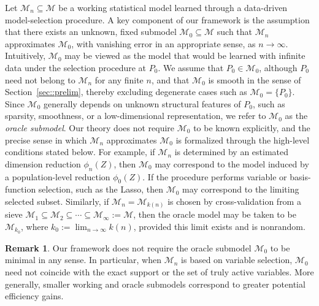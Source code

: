 \documentclass[11pt]{article}
\theoremstyle{definition}
\newtheorem{remark}{Remark}
\begin{document}
Let \(\mathcal{M}_n \subseteq \mathcal{M}\) be a working statistical model learned through a data-driven model-selection procedure. A key component of our framework is the assumption that there exists an unknown, fixed submodel \(\mathcal{M}_0 \subseteq \mathcal{M}\) such that \(\mathcal{M}_n\) approximates \(\mathcal{M}_0\), with vanishing error in an appropriate sense, as \(n \to \infty\). Intuitively, \(\mathcal{M}_0\) may be viewed as the model that would be learned with infinite data under the selection procedure at \(P_0\). We assume that \(P_0 \in \mathcal{M}_0\), although \(P_0\) need not belong to \(\mathcal{M}_n\) for any finite \(n\), and that \(\mathcal{M}_0\) is smooth in the sense of Section~\ref{sec::prelim}, thereby excluding degenerate cases such as \(\mathcal{M}_0 = \{P_0\}\). Since \(\mathcal{M}_0\) generally depends on unknown structural features of \(P_0\), such as sparsity, smoothness, or a low-dimensional representation, we refer to \(\mathcal{M}_0\) as the \emph{oracle submodel}. Our theory does not require \(\mathcal{M}_0\) to be known explicitly, and the precise sense in which \(\mathcal{M}_n\) approximates \(\mathcal{M}_0\) is formalized through the high-level conditions stated below. For example, if \(\mathcal{M}_n\) is determined by an estimated dimension reduction \(\phi_n(Z)\), then \(\mathcal{M}_0\) may correspond to the model induced by a population-level reduction \(\phi_0(Z)\). If the procedure performs variable or basis-function selection, such as the Lasso, then \(\mathcal{M}_0\) may correspond to the limiting selected subset. Similarly, if \(\mathcal{M}_n = \mathcal{M}_{k(n)}\) is chosen by cross-validation from a sieve \(\mathcal{M}_1 \subseteq \mathcal{M}_2 \subseteq \cdots \subseteq \mathcal{M}_\infty := \mathcal{M}\), then the oracle model may be taken to be \(\mathcal{M}_{k_0}\), where \(k_0 := \lim_{n \to \infty} k(n)\), provided this limit exists and is nonrandom.
 

\begin{remark}
Our framework does not require the oracle submodel \(\mathcal{M}_0\) to be minimal in any sense. In particular, when \(\mathcal{M}_n\) is based on variable selection, \(\mathcal{M}_0\) need not coincide with the exact support or the set of truly active variables. More generally, smaller working and oracle submodels correspond to greater potential efficiency gains.
\end{remark}

 
  
\end{document}
